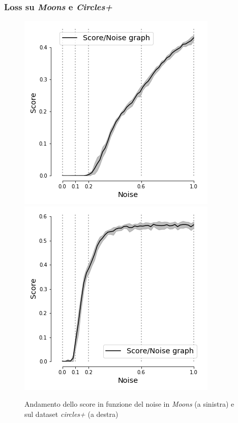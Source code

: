 \documentclass{beamer}
\begin{document}
\begin{frame}
 \frametitle{Loss su \textit{Moons} e \textit{Circles+}}
  \begin{figure}[H]
   \includegraphics[scale = 0.42]{images/score_noise_moons.png}
   \includegraphics[scale = 0.42]{images/score_noise_circles+.png}
   \caption{\large Andamento dello score in funzione del noise in \textit{Moons} (a sinistra) e sul dataset \textit{circles+} (a destra)}
    \end{figure}

\end{frame}
\end{document}
